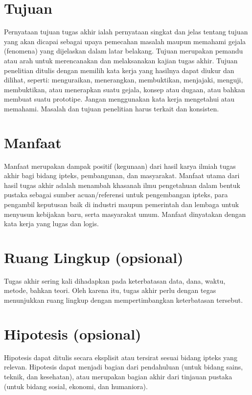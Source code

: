 \section{Tujuan}

Pernyataan tujuan tugas akhir ialah pernyataan singkat dan jelas tentang tujuan
yang akan dicapai sebagai upaya pemecahan masalah maupun memahami gejala
(fenomena) yang dijelaskan dalam latar belakang. Tujuan merupakan pemandu atau
arah untuk merencanakan dan melaksanakan kajian tugas akhir. Tujuan penelitian
ditulis dengan memilih kata kerja yang hasilnya dapat diukur dan dilihat,
seperti: menguraikan, menerangkan, membuktikan, menjajaki, menguji,
membuktikan, atau menerapkan suatu gejala, konsep atau dugaan, atau bahkan
membuat suatu prototipe. Jangan menggunakan kata kerja mengetahui atau
memahami. Masalah dan tujuan penelitian harus terkait dan konsisten.

\section{Manfaat}

Manfaat merupakan dampak positif (kegunaan) dari hasil karya ilmiah tugas akhir
bagi bidang ipteks, pembangunan, dan masyarakat. Manfaat utama dari hasil tugas
akhir adalah menambah khasanah ilmu pengetahuan dalam bentuk pustaka sebagai
sumber acuan/referensi untuk pengembangan ipteks, para pengambil keputusan baik
di industri maupun pemerintah dan lembaga untuk menyusun kebijakan baru, serta
masyarakat umum. Manfaat dinyatakan dengan kata kerja yang lugas dan logis.

\section{Ruang Lingkup (opsional)}

Tugas akhir sering kali dihadapkan pada keterbatasan data, dana, waktu, metode,
bahkan teori. Oleh karena itu, tugas akhir perlu dengan tegas menunjukkan ruang
lingkup dengan mempertimbangkan keterbatasan tersebut.

\section{Hipotesis (opsional)}

Hipotesis dapat ditulis secara eksplisit atau tersirat sesuai bidang ipteks yang
relevan. Hipotesis dapat menjadi bagian dari pendahuluan (untuk bidang sains,
teknik, dan kesehatan), atau merupakan bagian akhir dari tinjauan pustaka
(untuk bidang sosial, ekonomi, dan humaniora).
